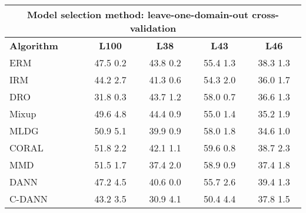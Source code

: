 \documentclass{article}
\begin{document}
\begin{center}
\begin{tabular}{lcccc}
\toprule
\multicolumn{5}{c}{\textbf{Model selection method: leave-one-domain-out cross-validation}} \\
\midrule
\textbf{Algorithm}    & \textbf{L100}             & \textbf{L38}              & \textbf{L43}              & \textbf{L46}              \\
\midrule
ERM                       & 47.5  0.2            & 43.8  0.2            & 55.4  1.3            & 38.3  1.3            \\
IRM                       & 44.2  2.7            & 41.3  0.6            & 54.3  2.0            & 36.0  1.7            \\
DRO                 & 31.8  0.3            & 43.7  1.2            & 58.0  0.7            & 36.6  1.3            \\
Mixup                     & 49.6  4.8            & 44.4  0.9            & 55.0  1.4            & 35.2  1.9            \\
MLDG                      & 50.9  5.1            & 39.9  0.9            & 58.0  1.8            & 34.6  1.0            \\
CORAL                     & 51.8  2.2            & 42.1  1.1            & 59.6  0.8            & 38.7  2.3            \\
MMD                       & 51.5  1.7            & 37.4  2.0            & 58.9  0.9            & 37.4  1.8            \\
DANN                       & 47.2  4.5            & 40.6  0.0            & 55.7  2.6            & 39.4  1.3            \\
C-DANN                   & 43.2  3.5            & 30.9  4.1            & 50.4  4.4            & 37.8  1.5            \\
\bottomrule
\end{tabular}
\end{center}
\end{document}
